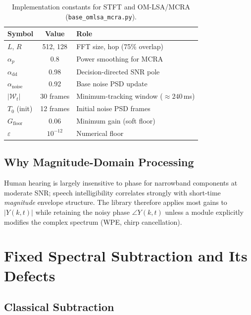 \begin{table}[H]
  \centering
  \caption{Implementation constants for STFT and OM-LSA/MCRA (\texttt{base\_omlsa\_mcra.py}).}
  \label{tab:omlsa_constants}
  \begin{tabular}{lcl}
    \toprule
    \textbf{Symbol} & \textbf{Value} & \textbf{Role} \\
    \midrule
    $L$, $R$           & 512, 128   & FFT size, hop (75\% overlap) \\
    $\alpha_p$         & 0.8        & Power smoothing for MCRA \\
    $\alpha_{\mathrm{dd}}$ & 0.98   & Decision-directed SNR pole \\
    $\alpha_{\mathrm{noise}}$ & 0.92 & Base noise PSD update \\
    $|\mathcal{W}_t|$  & 30 frames  & Minimum-tracking window ($\approx 240$\,ms) \\
    $T_0$ (init)       & 12 frames  & Initial noise PSD frames \\
    $G_{\mathrm{floor}}$ & 0.06     & Minimum gain (soft floor) \\
    $\varepsilon$      & $10^{-12}$ & Numerical floor \\
    \bottomrule
  \end{tabular}
\end{table}

\subsection{Why Magnitude-Domain Processing}

Human hearing is largely insensitive to phase for narrowband components at moderate SNR; speech intelligibility correlates strongly with short-time \emph{magnitude} envelope structure. The library therefore applies most gains to $|Y(k,t)|$ while retaining the noisy phase $\angle Y(k,t)$ unless a module explicitly modifies the complex spectrum (WPE, chirp cancellation).

\section{Fixed Spectral Subtraction and Its Defects}
\label{sec:fixed_sub_limit}

\subsection{Classical Subtraction}

